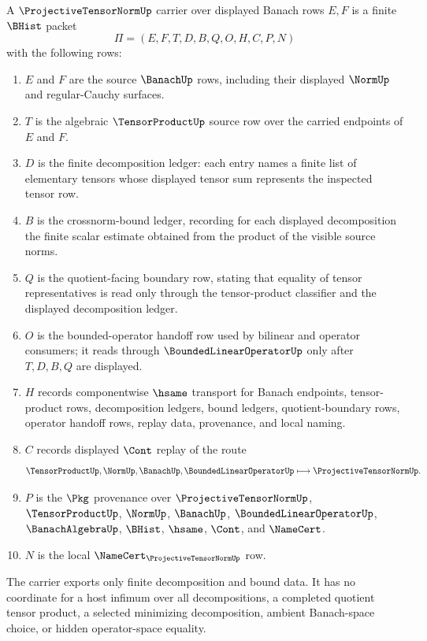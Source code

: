 \begin{definition}
\label{def:projective-tensor-norm-carrier}
A $\ProjectiveTensorNormUp$ carrier over displayed Banach rows $E,F$ is a finite $\BHist$ packet
$$
\Pi=(E,F,T,D,B,Q,O,H,C,P,N)
$$
with the following rows:
\begin{enumerate}
\item $E$ and $F$ are the source $\BanachUp$ rows, including their displayed $\NormUp$ and regular-Cauchy surfaces.
\item $T$ is the algebraic $\TensorProductUp$ source row over the carried endpoints of $E$ and $F$.
\item $D$ is the finite decomposition ledger: each entry names a finite list of elementary tensors whose displayed tensor sum represents the inspected tensor row.
\item $B$ is the crossnorm-bound ledger, recording for each displayed decomposition the finite scalar estimate obtained from the product of the visible source norms.
\item $Q$ is the quotient-facing boundary row, stating that equality of tensor representatives is read only through the tensor-product classifier and the displayed decomposition ledger.
\item $O$ is the bounded-operator handoff row used by bilinear and operator consumers; it reads through $\BoundedLinearOperatorUp$ only after $T,D,B,Q$ are displayed.
\item $H$ records componentwise $\hsame$ transport for Banach endpoints, tensor-product rows, decomposition ledgers, bound ledgers, quotient-boundary rows, operator handoff rows, replay data, provenance, and local naming.
\item $C$ records displayed $\Cont$ replay of the route
$$
\TensorProductUp,\NormUp,\BanachUp,\BoundedLinearOperatorUp
\longmapsto
\ProjectiveTensorNormUp .
$$
\item $P$ is the $\Pkg$ provenance over $\ProjectiveTensorNormUp$, $\TensorProductUp$, $\NormUp$, $\BanachUp$, $\BoundedLinearOperatorUp$, $\BanachAlgebraUp$, $\BHist$, $\hsame$, $\Cont$, and $\NameCert$.
\item $N$ is the local $\NameCert_{\ProjectiveTensorNormUp}$ row.
\end{enumerate}
The carrier exports only finite decomposition and bound data. It has no coordinate for a host infimum over all decompositions, a completed quotient tensor product, a selected minimizing decomposition, ambient Banach-space choice, or hidden operator-space equality.
\end{definition}


